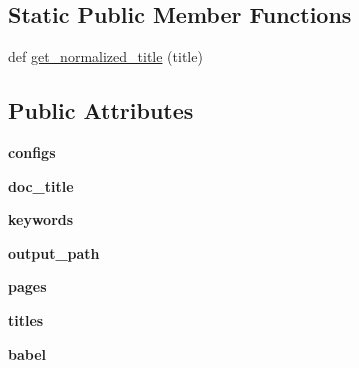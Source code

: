 \subsection*{Static Public Member Functions}
\begin{DoxyCompactItemize}
\item 
def \hyperlink{classtexla_1_1PageTree_1_1PageTree_1_1PageTree_adfebbe59a30cbde4040c5065c867107f}{get\+\_\+normalized\+\_\+title} (title)
\end{DoxyCompactItemize}
\subsection*{Public Attributes}
\begin{DoxyCompactItemize}
\item 
\hypertarget{classtexla_1_1PageTree_1_1PageTree_1_1PageTree_ac710e2af61b4c121eaaccd16d357ffc1}{}\label{classtexla_1_1PageTree_1_1PageTree_1_1PageTree_ac710e2af61b4c121eaaccd16d357ffc1} 
{\bfseries configs}
\item 
\hypertarget{classtexla_1_1PageTree_1_1PageTree_1_1PageTree_ab175bb024cb4df2956d781cba7d9ae45}{}\label{classtexla_1_1PageTree_1_1PageTree_1_1PageTree_ab175bb024cb4df2956d781cba7d9ae45} 
{\bfseries doc\+\_\+title}
\item 
\hypertarget{classtexla_1_1PageTree_1_1PageTree_1_1PageTree_a4dbb8e76d48d6df1087a071317830395}{}\label{classtexla_1_1PageTree_1_1PageTree_1_1PageTree_a4dbb8e76d48d6df1087a071317830395} 
{\bfseries keywords}
\item 
\hypertarget{classtexla_1_1PageTree_1_1PageTree_1_1PageTree_a76821f6c273db4984769652f1a6f5968}{}\label{classtexla_1_1PageTree_1_1PageTree_1_1PageTree_a76821f6c273db4984769652f1a6f5968} 
{\bfseries output\+\_\+path}
\item 
\hypertarget{classtexla_1_1PageTree_1_1PageTree_1_1PageTree_a1891ebb18db8befa952b007ddb5ecf34}{}\label{classtexla_1_1PageTree_1_1PageTree_1_1PageTree_a1891ebb18db8befa952b007ddb5ecf34} 
{\bfseries pages}
\item 
\hypertarget{classtexla_1_1PageTree_1_1PageTree_1_1PageTree_ab61fc284bed3143e0e53872e7ffdf82e}{}\label{classtexla_1_1PageTree_1_1PageTree_1_1PageTree_ab61fc284bed3143e0e53872e7ffdf82e} 
{\bfseries titles}
\item 
\hypertarget{classtexla_1_1PageTree_1_1PageTree_1_1PageTree_a6e3bbe6e9d85e394a7d2867f9053960b}{}\label{classtexla_1_1PageTree_1_1PageTree_1_1PageTree_a6e3bbe6e9d85e394a7d2867f9053960b} 
{\bfseries babel}
\item 

\end{DoxyCompactItemize}
